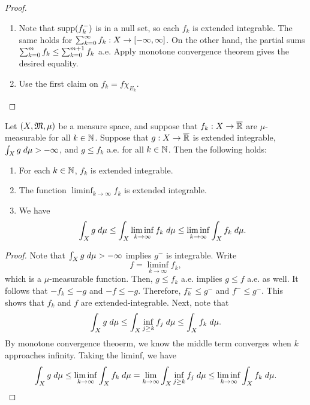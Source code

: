 \documentclass[a4paper]{article}
\begin{document}
\begin{proof}
\begin{enumerate}
  \item Note that $\operatorname{supp}(f_k^-)$ is in a null set, so each $f_k$ is 
  extended integrable. The same holds for $\sum_{k=0}^\infty f_k : 
  X \to [-\infty, \infty]$. On the other hand, the partial sums 
  $\sum_{k=0}^m f_k \leq \sum_{k=0}^{m+1} f_k$ a.e. Apply monotone 
  convergence theorem gives the desired equality.

  \item Use the first claim on $f_k = f \chi_{E_k}$.
\end{enumerate}
\end{proof}

\begin{thm}
Let $(X, \mathfrak{M}, \mu)$ be a measure space, and suppose 
that $f_k : X \to \overline{\mathbb{R}}$ are $\mu$-measurable 
for all $k \in \mathbb{N}$. Suppose that $g : X \to \overline{\mathbb{R}}$ is 
extended integrable, $\int_X g \; d \mu > - \infty$, and 
$g \leq f_k$ a.e. for all $k \in \mathbb{N}$. Then the following 
holds: 
\begin{enumerate}
\item For each $k \in \mathbb{N}$, $f_k$ is extended integrable. 
\item The function $\liminf_{k \to \infty} f_k$ 
is extended integrable. 
\item We have 
\[
\int_X g \; d \mu \leq \int_X \liminf_{k \to \infty} 
f_k \; d \mu \leq \liminf_{k \to \infty} \int_X f_k \; d \mu.
\]
\end{enumerate}
\end{thm}

\begin{proof}
Note that $\int_X g \; d \mu > - \infty$ implies $g^-$ is 
integrable. Write 
\[
  f = \liminf_{k \to \infty} f_k,
\]
which is 
a $\mu$-measurable function. Then, $g \leq f_k$ a.e. implies 
$g \leq f$ a.e. as well. It follows that $-f_k \leq -g$
and $-f \leq -g$. Therefore, 
$f_k^- \leq g^-$ and $f^- \leq g^-$.
This shows that 
$f_k$ and $f$ are extended-integrable. Next, note that 
\[
\int_X g \; d \mu \leq \int_X \inf_{j \geq k} f_j \; d \mu 
\leq \int_X f_k \; d \mu.
\]
By monotone convergence theoerm, we know the middle term 
converges when $k$ approaches infinity. 
Taking the liminf, we have 
\[
\int_X g \; d \mu 
\leq 
\liminf_{k \to \infty} \int_X f_k \; d \mu
= \lim_{k \to \infty} \int_X 
\inf_{j \geq k} f_j \; d \mu 
\leq \liminf_{k \to \infty} \int_X f_k \; d \mu.
\]
\end{proof}
\end{document}
